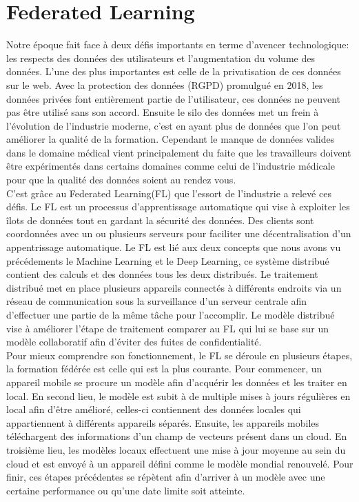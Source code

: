 \documentclass[12pt,a4paper]{report}
\begin{document}
\section{Federated Learning}

Notre époque fait face à deux défis importants en terme d'avencer technologique: les respects des données des utilisateurs et l'augmentation du volume des données. L'une des plus importantes est celle de la privatisation de ces données sur le web. Avec la protection des données (RGPD) promulgué en 2018, les données privées font entièrement partie de l'utilisateur, ces données ne peuvent pas être utilisé sans son accord. Ensuite le silo des données met un frein à l'évolution de l'industrie moderne, c'est en ayant plus de données que l'on peut améliorer la qualité de la formation. Cependant le manque de données valides dans le domaine médical vient principalement du faite que les travailleurs doivent être expérimentés dans certains domaines comme celui de l'industrie médicale pour que la qualité des données soient au rendez vous.\\

C'est grâce au Federated Learning(FL) que l'essort de l'industrie a relevé ces défis. Le FL est un processus d'apprentissage automatique qui vise à exploiter les îlots de données tout en gardant la sécurité des données. Des clients sont coordonnées avec un ou plusieurs serveurs pour faciliter une décentralisation d'un appentrissage automatique. Le FL est lié aux deux concepts que nous avons vu précédements le Machine Learning et le Deep Learning, ce système distribué contient des calculs et des données tous les deux distribués. Le traitement distribué met en place plusieurs appareils connectés à différents endroits via un réseau de communication sous la surveillance d'un serveur centrale afin d'effectuer une partie de la même tâche pour l'accomplir. Le modèle distribué vise à améliorer l'étape de traitement comparer au FL qui lui se base sur un modèle collaboratif afin d'éviter des fuites de confidentialité.\\

Pour mieux comprendre son fonctionnement, le FL se déroule en plusieurs étapes, la formation fédérée est celle qui est la plus courante. Pour commencer, un appareil mobile se procure un modèle afin d'acquérir les données et les traiter en local. En second lieu, le modèle est subit à de multiple mises à jours régulières en local afin d'être amélioré, celles-ci contiennent des données locales qui appartiennent à différents appareils séparés. Ensuite, les appareils mobiles téléchargent des informations d'un champ de vecteurs présent dans un cloud. En troisième lieu, les modèles locaux effectuent une mise à jour moyenne au sein du cloud et est envoyé à un appareil défini comme le modèle mondial renouvelé. Pour finir, ces étapes précédentes se répètent afin d'arriver à un modèle avec une certaine performance ou qu'une date limite soit atteinte.
\end{document}
